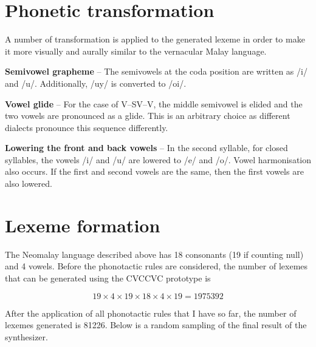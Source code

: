 \documentclass{article}
\begin{document}
\section{Phonetic transformation}

A number of transformation is applied to the generated lexeme in order to make it more visually and aurally similar to the vernacular Malay language.

\textbf{Semivowel grapheme} -- The semivowels at the coda position are written as /i/ and /u/. Additionally, /uy/ is converted to /oi/.

\textbf{Vowel glide} -- For the case of V--SV--V, the middle semivowel is elided and the two vowels are pronounced as a glide. This is an arbitrary choice as different dialects pronounce this sequence differently.

\textbf{Lowering the front and back vowels} -- In the second syllable, for closed syllables, the vowels /i/ and /u/ are lowered to /e/ and /o/. Vowel harmonisation also occurs. If the first and second vowels are the same, then the first vowels are also lowered.

\section{Lexeme formation}

The Neomalay language described above has 18 consonants (19 if counting null) and 4 vowels. Before the phonotactic rules are considered, the number of lexemes that can be generated using the CVCCVC prototype is

\[ 19 \times 4 \times 19 \times 18 \times 4 \times 19 = \num{1975392} \]

After the application of all phonotactic rules that I have so far, the number of lexemes generated is \num{81226}. Below is a random sampling of the final result of the synthesizer.
\end{document}
